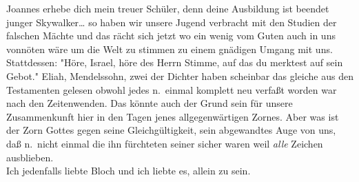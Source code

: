 \documentclass[
]{article}
\begin{document}
Joannes erhebe dich mein treuer Schüler, denn deine Ausbildung ist
beendet junger Skywalker\ldots{} so haben wir unsere Jugend verbracht
mit den Studien der falschen Mächte und das rächt sich jetzt wo ein
wenig vom Guten auch in uns vonnöten wäre um die Welt zu stimmen zu
einem gnädigen Umgang mit uns.\\
Stattdessen: "Höre, Israel, höre des Herrn Stimme, auf das du merktest
auf sein Gebot." Eliah, Mendelssohn, zwei der Dichter haben scheinbar
das gleiche aus den Testamenten gelesen obwohl jedes n.~einmal komplett
neu verfaßt worden war nach den Zeitenwenden. Das könnte auch der Grund
sein für unsere Zusammenkunft hier in den Tagen jenes allgegenwärtigen
Zornes. Aber was ist der Zorn Gottes gegen seine Gleichgültigkeit, sein
abgewandtes Auge von uns, daß n.~nicht einmal die ihn fürchteten seiner
sicher waren weil \emph{alle }Zeichen ausblieben.\\
Ich jedenfalls liebte Bloch und ich liebte es, allein zu sein.
\end{document}

